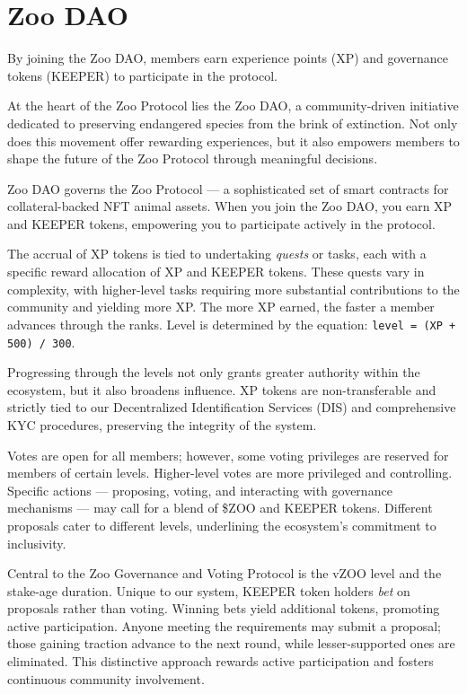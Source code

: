 \section{Zoo DAO}
\label{sec:dao}

By joining the Zoo DAO, members earn experience points (XP) and governance tokens (KEEPER) to participate in the protocol.

At the heart of the Zoo Protocol lies the Zoo DAO, a community-driven initiative dedicated to preserving endangered species from the brink of extinction. Not only does this movement offer rewarding experiences, but it also empowers members to shape the future of the Zoo Protocol through meaningful decisions.

Zoo DAO governs the Zoo Protocol --- a sophisticated set of smart contracts for collateral-backed NFT animal assets. When you join the Zoo DAO, you earn XP and KEEPER tokens, empowering you to participate actively in the protocol.

The accrual of XP tokens is tied to undertaking \emph{quests} or tasks, each with a specific reward allocation of XP and KEEPER tokens. These quests vary in complexity, with higher-level tasks requiring more substantial contributions to the community and yielding more XP. The more XP earned, the faster a member advances through the ranks. Level is determined by the equation: \texttt{level = (XP + 500) / 300}.

Progressing through the levels not only grants greater authority within the ecosystem, but it also broadens influence. XP tokens are non-transferable and strictly tied to our Decentralized Identification Services (DIS) and comprehensive KYC procedures, preserving the integrity of the system.

Votes are open for all members; however, some voting privileges are reserved for members of certain levels. Higher-level votes are more privileged and controlling. Specific actions --- proposing, voting, and interacting with governance mechanisms --- may call for a blend of \$ZOO and KEEPER tokens. Different proposals cater to different levels, underlining the ecosystem's commitment to inclusivity.

Central to the Zoo Governance and Voting Protocol is the vZOO level and the stake-age duration. Unique to our system, KEEPER token holders \emph{bet} on proposals rather than voting. Winning bets yield additional tokens, promoting active participation. Anyone meeting the requirements may submit a proposal; those gaining traction advance to the next round, while lesser-supported ones are eliminated. This distinctive approach rewards active participation and fosters continuous community involvement.
